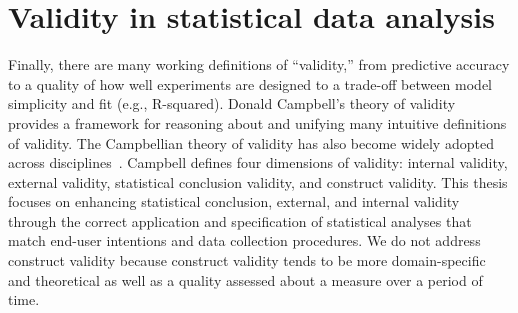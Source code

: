 \begin{comment}
Prior domain-specific languages (DSLs) have focused on several different stages
of data exploration, experiment design, and data cleaning to shift the burden of
accurate processing from users to systems. To support data exploration,
Vega-lite~\cite{satyanarayan2017vega} is a high-level declarative language that
supports users in developing interactive data visualizations without writing
functional reactive components. PlanOut~\cite{bakshy2014planout} is a DSL for
expressing and coordinating online field experiments. More niche than PlanOut,
Touchstone2 provides the Touchstone Language for specifying condition
randomization in experiments (e.g., Latin
Squares)~\cite{eiselmayer2019touchstone2}.%
essential aspect of the domain knowledge users encode in Tea programs. To
support rapid data cleaning,  Wrangler~\cite{kandel2011wrangler} combines a
mixed-initiative interface with a declarative transformation language. Tea can
be integrated with tools such as Wrangler that produce cleaned CSV files ready
for analysis.

In comparison to these previous DSLs, Tea provides a language to support another crucial step in the data life cycle: statistical analysis. 

\end{comment}

\section{Validity in statistical data analysis}
Finally, there are many working definitions of ``validity,'' from predictive
accuracy to a quality of how well experiments are designed to a trade-off
between model simplicity and fit (e.g., R-squared). Donald Campbell's theory of
validity~\cite{shadish2010campbell} provides a framework for reasoning about and
unifying many intuitive definitions of validity. The Campbellian theory of
validity has also become widely adopted across
disciplines~\cite{shadish2010campbell}. Campbell defines four dimensions of
validity: internal validity, external validity, statistical conclusion validity,
and construct validity. This thesis focuses on enhancing statistical conclusion,
external, and internal validity through the correct application and
specification of statistical analyses that match end-user intentions and data
collection procedures. We do not address construct validity because construct
validity tends to be more domain-specific and theoretical as well as a quality
assessed about a measure over a period of time. 

